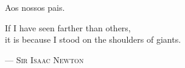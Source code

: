 %
\begin{dedicatoria}
Aos nossos pais.\\[4ex] %
\begin{itshape} %
If I have seen farther than others,\\
it is because I stood on the shoulders of giants.\\
\end{itshape}
--- \textsc{Sir Isaac Newton} %
\end{dedicatoria}